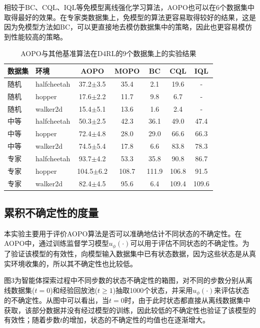 \documentclass{article}
\begin{document}
相较于BC、CQL、IQL等免模型离线强化学习算法，AOPO也可以在6个数据集中取得最好的效果。在专家类数据集上，免模型的算法更容易取得较好的结果，这是因为免模型方法如BC，可以更直接地去模仿数据集中的策略，因此也更容易模仿到性能较高的策略。

\begin{table}[htbp]
  \centering
  \caption{AOPO与其他基准算法在D4RL的9个数据集上的实验结果}
  \small
  \begin{tabular}{l l c c c c c}
    \toprule
    数据集 & 环境          & AOPO          & MOPO  & BC    & CQL   & IQL   \\
    \midrule
    随机  & halfcheetah & 37.2$\pm$3.5  & 35.4  & 2.1   & 19.6  & -     \\
    随机  & hopper      & 17.6$\pm$2.2  & 11.7  & 9.8   & 6.7   & -     \\
    随机  & walker2d    & 15.4$\pm$5.1  & 13.6  & 1.6   & 2.4   & -     \\
    中等  & halfcheetah & 50.3$\pm$2.5  & 42.3  & 36.1  & 49.0  & 47.4  \\
    中等  & hopper      & 72.4$\pm$4.8  & 28.0  & 29.0  & 66.6  & 66.3  \\
    中等  & walker2d    & 74.5$\pm$5.4  & 17.8  & 6.6   & 83.8  & 78.3  \\
    专家  & halfcheetah & 93.7$\pm$4.2  & 53.3  & 35.8  & 90.8  & 86.7  \\
    专家  & hopper      & 104.5$\pm$6.2 & 108.7 & 111.9 & 106.8 & 91.5  \\
    专家  & walker2d    & 82.4$\pm$4.5  & 95.6  & 6.4   & 109.4 & 109.6 \\
    \bottomrule
  \end{tabular}
  \label{tab1}
\end{table}

\subsection{累积不确定性的度量}
本实验主要用于评价AOPO算法是否可以准确地估计不同状态的不确定性。在AOPO中，通过训练监督学习模型$u_{\phi}(\cdot)$可以用于评估不同状态的不确定性。为了验证该模型的有效性，向模型输入数据集中已有状态数据，因为这些状态是从真实环境收集的，所以其不确定性也比较低。

图3为智能体探索过程中不同步数的状态不确定性的箱图，对不同的步数分别从离线数据集($t=0$)和经验回放池($t \geq1$)抽取1000个状态，并采用$u_{\phi}(\cdot)$来评估状态的不确定性。从图中可以看出，当$t=0$时，由于此时状态都直接从离线数据集中获取，该部分数据并没有经过模型的训练，因此较低的不确定性也验证了该模型的有效性；随着步数$t$的增加，状态的不确定性的均值也在逐渐增大。
\end{document}

